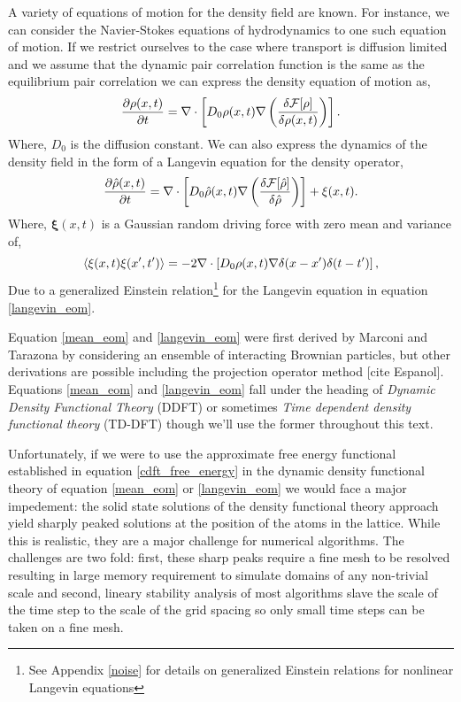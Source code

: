 A variety of equations of motion for the density field are known.
For instance, we can consider the Navier-Stokes equations of hydrodynamics to
one such equation of motion. If we restrict ourselves to the case where
transport is diffusion limited and we assume that the dynamic pair correlation
function is the same as the equilibrium pair correlation we can express the
density equation of motion as,
%
\begin{equation}
    \label{mean_eom}
    \frac{\partial \rho(x, t)}{\partial t} = 
        \nabla \cdot \left[
            D_0 \rho(x, t) \nabla \left(\frac{\delta \mathcal{F}[\rho]}{\delta \rho(x, t)}\right)
        \right].
\end{equation}
%
Where, $D_0$ is the diffusion constant. We can also express the dynamics of
the density field in the form of a Langevin equation for the density operator,
%
\begin{equation}
    \label{langevin_eom}
    \frac{\partial \hat{\rho}(x, t)}{\partial t} =
        \nabla \cdot \left[
            D_0 \hat{\rho}(x, t) \nabla \left(\frac{\delta \mathcal{F}[\hat{\rho}]}{\delta \hat{\rho}}\right)
        \right] + \xi(x, t).
\end{equation}
%
Where, $\mathbf{\xi}(x, t)$ is a Gaussian random driving force with zero mean
and variance of,
%
\begin{equation}
    \left\langle \xi(x, t)\xi(x^\prime, t^\prime) \right\rangle = -2 \nabla \cdot \left[ D_0 \rho(x,t) 
        \nabla \delta(x - x^\prime) \delta(t - t^\prime)
    \right],
\end{equation}
%
Due to a generalized Einstein relation\footnote{See Appendix \ref{noise} for
details on generalized Einstein relations for nonlinear Langevin equations} for
the Langevin equation in equation \ref{langevin_eom}.

Equation \ref{mean_eom} and \ref{langevin_eom} were first derived by Marconi
and Tarazona by considering an ensemble of interacting Brownian particles, but
other derivations are possible including the projection operator method [cite
Espanol].  Equations \ref{mean_eom} and \ref{langevin_eom} fall under the
heading of \textit{Dynamic Density Functional Theory} (DDFT) or sometimes
\textit{Time dependent density functional theory} (TD-DFT) though we'll use the
former throughout this text.

Unfortunately, if we were to use the approximate free energy functional
established in equation \ref{cdft_free_energy} in the dynamic density
functional theory of equation \ref{mean_eom} or \ref{langevin_eom} we would
face a major impedement: the solid state solutions of the density functional
theory approach yield sharply peaked solutions at the position of the atoms in
the lattice. While this is realistic, they are a major challenge for numerical
algorithms. The challenges are two fold: first, these sharp peaks require a fine mesh 
to be resolved resulting in large memory requirement to simulate domains 
of any non-trivial scale and second, lineary stability analysis of most algorithms 
slave the scale of the time step to the scale of the grid spacing so only small
time steps can be taken on a fine mesh.

